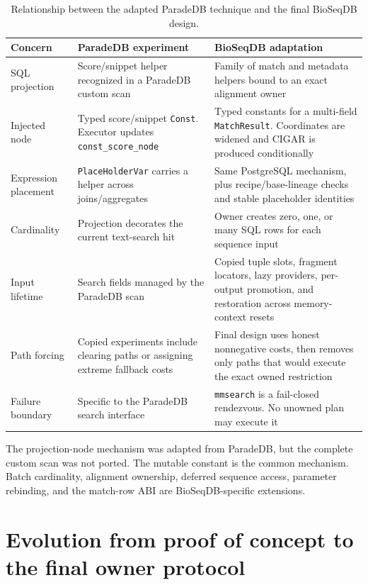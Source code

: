 \begin{table}[htbp]
\centering
\small
\caption{Relationship between the adapted ParadeDB technique and the final
BioSeqDB design.}
\label{tab:paradedb-bioseq-comparison}
\begin{tabular}{@{}p{}p{}p{}@{}}
\toprule
Concern & ParadeDB experiment & BioSeqDB adaptation \\
\midrule
SQL projection &
Score/snippet helper recognized in a ParadeDB custom scan &
Family of match and metadata helpers bound to an exact alignment owner \\
Injected node &
Typed score/snippet \texttt{Const}.  Executor updates
\texttt{const\_score\_node} &
Typed constants for a multi-field \texttt{MatchResult}.  Coordinates are
widened and CIGAR is produced conditionally \\
Expression placement &
\texttt{PlaceHolderVar} carries a helper across joins/aggregates &
Same PostgreSQL mechanism, plus recipe/base-lineage checks and stable
placeholder identities \\
Cardinality &
Projection decorates the current text-search hit &
Owner creates zero, one, or many SQL rows for each sequence input \\
Input lifetime &
Search fields managed by the ParadeDB scan &
Copied tuple slots, fragment locators, lazy providers, per-output promotion,
and restoration across memory-context resets \\
Path forcing &
Copied experiments include clearing paths or assigning extreme fallback
costs &
Final design uses honest nonnegative costs, then removes only paths that
would execute the exact owned restriction \\
Failure boundary &
Specific to the ParadeDB search interface &
\texttt{mmsearch} is a fail-closed rendezvous.  No unowned plan may execute it \\
\bottomrule
\end{tabular}
\end{table}

The projection-node mechanism was adapted from ParadeDB, but the complete
custom scan was not ported.  The mutable constant is the common mechanism.
Batch cardinality, alignment ownership, deferred sequence access, parameter
rebinding, and the match-row ABI are BioSeqDB-specific extensions.

\section{Evolution from proof of concept to the final owner protocol}
\label{sec:customscan-design-evolution}

